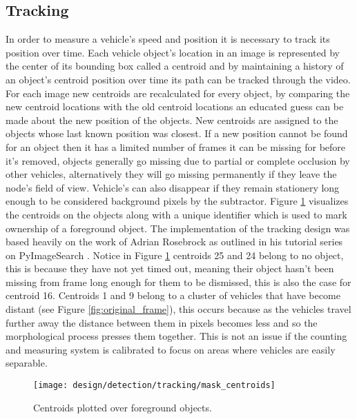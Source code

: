 \subsection{Tracking}

In order to measure a vehicle's speed and position it is necessary to track its position over time. Each vehicle object's location in an image is represented by the center of its bounding box called a centroid and by maintaining a history of an object's centroid position over time its path can be tracked through the video. For each image new centroids are recalculated for every object, by comparing the new centroid locations with the old centroid locations an educated guess can be made about the new position of the objects. New centroids are assigned to the objects whose last known position was closest. If a new position cannot be found for an object then it has a limited number of frames it can be missing for before it's removed, objects generally go missing due to partial or complete occlusion by other vehicles, alternatively they will go missing permanently if they leave the node's field of view. Vehicle's can also disappear if they remain stationery long enough to be considered background pixels by the subtractor. Figure \ref{fig:centroids} visualizes the centroids on the objects along with a unique identifier which is used to mark ownership of a foreground object. The implementation of the tracking design was based heavily on the work of Adrian Rosebrock as outlined in his tutorial series on PyImageSearch \cite{adrian_rosebrock_simple_object_tracking}. Notice in Figure \ref{fig:centroids} centroids 25 and 24 belong to no object, this is because they have not yet timed out, meaning their object hasn't been missing from frame long enough for them to be dismissed, this is also the case for centroid 16. Centroids 1 and 9 belong to a cluster of vehicles that have become distant (see Figure \ref{fig:original_frame}), this occurs because as the vehicles travel further away the distance between them in pixels becomes less and so the morphological process presses them together. This is not an issue if the counting and measuring system is calibrated to focus on areas where vehicles are easily separable.

\begin{figure}[H]
    \centering
    \centering\texttt{[image: design/detection/tracking/mask\_centroids]}
    \caption{Centroids plotted over foreground objects.}
    \label{fig:centroids}
\end{figure}

